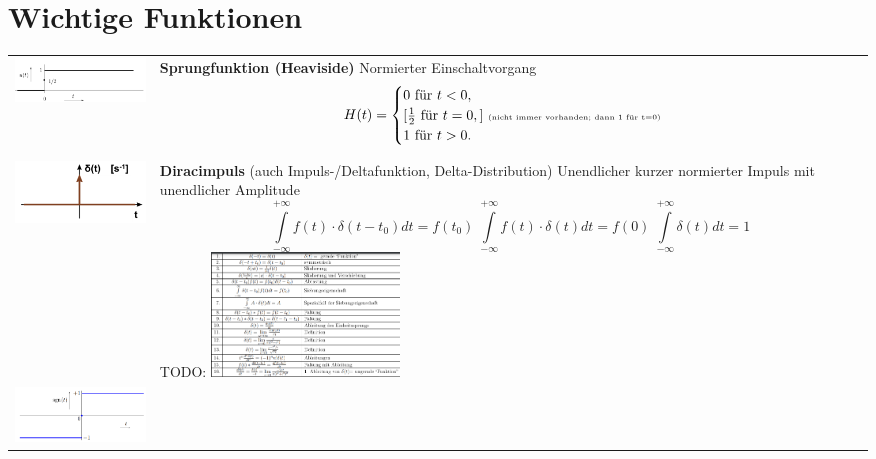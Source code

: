 
\section{Wichtige Funktionen}
\begin{tabular}{p{5cm} p{12.5cm}}
  \includegraphics[width = 5cm, valign=t]{include/Wichtige Funktionen/img/Sprungfunktion.png} &
  \textbf{Sprungfunktion (Heaviside)}
  \footnotesize
  Normierter Einschaltvorgang
  $$H(t) = \begin{cases}
               0 \textrm{ für }  t<0,                                                                      \\
               [\frac{1}{2} \textrm{ für }  t = 0,] \textrm{ \tiny(nicht immer vorhanden; dann 1 für t=0)} \\
               1 \textrm{ für }  t >0.
             \end{cases}   $$
  \\
  \includegraphics[width = 5cm, valign=t]{include/Wichtige Funktionen/img/Impulsfunktion.png} &
  \textbf{Diracimpuls} \tiny (auch Impuls-/Deltafunktion, Delta-Distribution)
  \footnotesize \newline
  Unendlicher kurzer normierter Impuls mit unendlicher Amplitude
  $$\int\limits _{-\infty} ^{+\infty} f(t) \cdot \delta (t-t_0) dt = f(t_0) \;
    \int\limits _{-\infty} ^{+\infty} f(t) \cdot \delta (t) dt = f(0) \;
    \int\limits _{-\infty} ^{+\infty} \delta (t) dt = 1$$
  TODO: \includegraphics[width=5cm]{include/Wichtige Funktionen/img/Eigenschaften _delta.png}   \\
  \includegraphics[width = 5cm, valign=t]{include/Wichtige Funktionen/img/Signumfunktion.png} &

\end{tabular}
